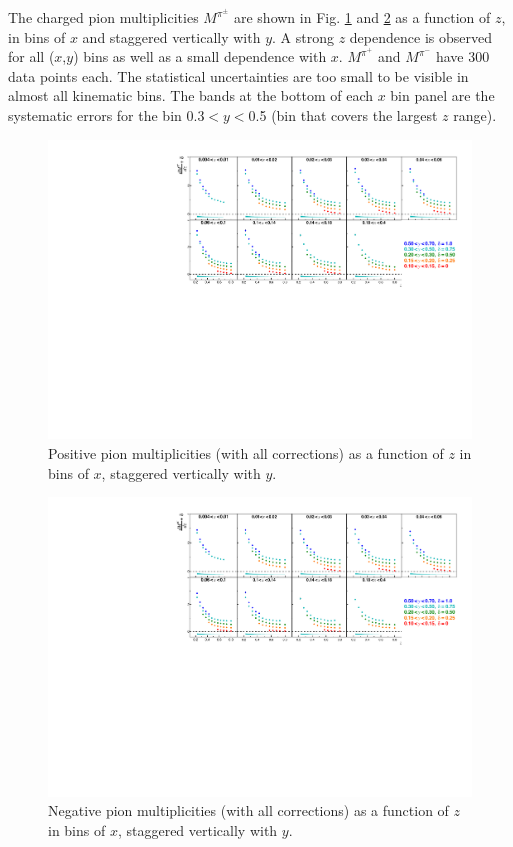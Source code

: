 The charged pion multiplicities $M^{\pi^{\pm}}$ are shown in Fig. \ref{pic:mpip} and \ref{pic:mpim} as a  function of $z$, in bins of $x$ and staggered vertically with $y$. A strong $z$ dependence is observed for all ($x$,$y$) bins as well as a small dependence with $x$. $M^{\pi^+}$ and $M^{\pi^-}$ have 300 data points each. The statistical uncertainties are too small to be visible in almost all kinematic bins. The bands at the bottom of each $x$ bin panel are the systematic errors for the bin 0.3$< y <$0.5 (bin that covers the largest $z$ range).

\begin{figure}[!h]
  \centering
	\includegraphics[scale=0.85]{./gfx/pip.pdf}
	\caption{Positive pion multiplicities (with all corrections) as a function of $z$ in bins of $x$, staggered vertically with $y$.}
	\label{pic:mpip}
\end{figure}

\begin{figure}[!h]
  \centering
	\includegraphics[scale=0.85]{./gfx/pim.pdf}
	\caption{Negative pion multiplicities (with all corrections) as a function of $z$ in bins of $x$, staggered vertically with $y$.}
	\label{pic:mpim}
\end{figure}


